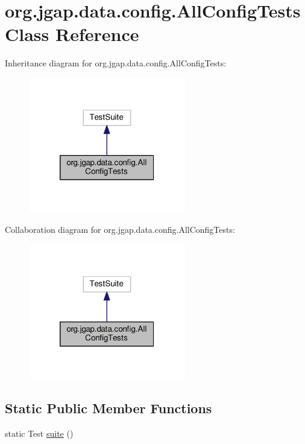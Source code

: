 \hypertarget{classorg_1_1jgap_1_1data_1_1config_1_1_all_config_tests}{\section{org.\-jgap.\-data.\-config.\-All\-Config\-Tests Class Reference}
\label{classorg_1_1jgap_1_1data_1_1config_1_1_all_config_tests}
}


Inheritance diagram for org.\-jgap.\-data.\-config.\-All\-Config\-Tests\-:
\nopagebreak
\begin{figure}[H]
\begin{center}
\leavevmode
\includegraphics[width=194pt]{classorg_1_1jgap_1_1data_1_1config_1_1_all_config_tests__inherit__graph}
\end{center}
\end{figure}


Collaboration diagram for org.\-jgap.\-data.\-config.\-All\-Config\-Tests\-:
\nopagebreak
\begin{figure}[H]
\begin{center}
\leavevmode
\includegraphics[width=194pt]{classorg_1_1jgap_1_1data_1_1config_1_1_all_config_tests__coll__graph}
\end{center}
\end{figure}
\subsection*{Static Public Member Functions}
\begin{DoxyCompactItemize}
\item 
static Test \hyperlink{classorg_1_1jgap_1_1data_1_1config_1_1_all_config_tests_a85dbfa5c5871e8bc9ec4af88af2b0702}{suite} ()
\end{DoxyCompactItemize}
